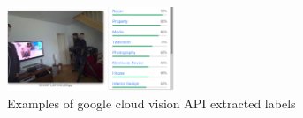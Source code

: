 \begin{figure}[H]
    \centering
    \captionsetup{justification=centering}

    \includegraphics[width=0.45\textwidth]{Sections/8Conclusion/images/google_labels_2.png}
    
    \caption[Google cloud vision API labels]{Examples of google cloud vision API extracted labels \cite{google}}
\end{figure}
